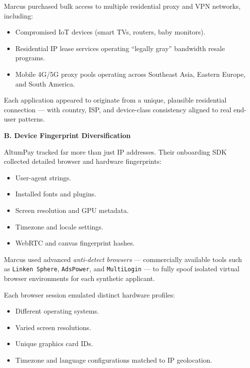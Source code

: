 Marcus purchased bulk access to multiple residential proxy and VPN networks, including:

\begin{itemize}
    \item Compromised IoT devices (smart TVs, routers, baby monitors).
    \item Residential IP lease services operating ``legally gray'' bandwidth resale programs.
    \item Mobile 4G/5G proxy pools operating across Southeast Asia, Eastern Europe, and South America.
\end{itemize}

Each application appeared to originate from a unique, plausible residential connection --- with country, ISP, and device-class consistency aligned to real end-user patterns.

\medskip

\textbf{B. Device Fingerprint Diversification}

AltumPay tracked far more than just IP addresses. Their onboarding SDK collected detailed browser and hardware fingerprints:

\begin{itemize}
    \item User-agent strings.
    \item Installed fonts and plugins.
    \item Screen resolution and GPU metadata.
    \item Timezone and locale settings.
    \item WebRTC and canvas fingerprint hashes.
\end{itemize}

Marcus used advanced \textit{anti-detect browsers} --- commercially available tools such as \texttt{Linken Sphere}, \texttt{AdsPower}, and \texttt{MultiLogin} --- to fully spoof isolated virtual browser environments for each synthetic applicant.

Each browser session emulated distinct hardware profiles:

\begin{itemize}
    \item Different operating systems.
    \item Varied screen resolutions.
    \item Unique graphics card IDs.
    \item Timezone and language configurations matched to IP geolocation.
\end{itemize}

